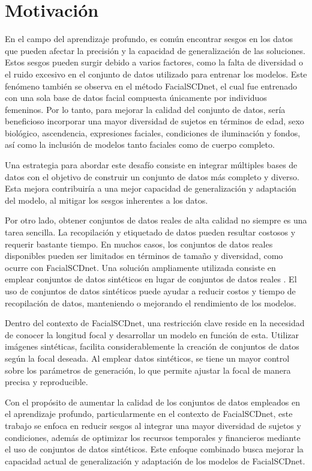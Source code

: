 \section{Motivación}

En el campo del aprendizaje profundo, es común encontrar sesgos en los datos que pueden afectar la precisión y la capacidad de generalización de las soluciones. Estos sesgos pueden surgir debido a varios factores, como la falta de diversidad o el ruido excesivo en el conjunto de datos utilizado para entrenar los modelos. Este fenómeno también se observa en el método FacialSCDnet, el cual fue entrenado con una sola base de datos facial compuesta únicamente por individuos femeninos.
Por lo tanto, para mejorar la calidad del conjunto de datos, sería beneficioso incorporar una mayor diversidad de sujetos en términos de edad, sexo biológico, ascendencia, expresiones faciales, condiciones de iluminación y fondos, así como la inclusión de modelos tanto faciales como de cuerpo completo. 

Una estrategia para abordar este desafío consiste en integrar múltiples bases de datos con el objetivo de construir un conjunto de datos más completo y diverso. Esta mejora contribuiría a una mejor capacidad de generalización y adaptación del modelo, al mitigar los sesgos inherentes a los datos.

Por otro lado, obtener conjuntos de datos reales de alta calidad no siempre es una tarea sencilla. La recopilación y etiquetado de datos pueden resultar costosos y requerir bastante tiempo. En muchos casos, los conjuntos de datos reales disponibles pueden ser limitados en términos de tamaño y diversidad, como ocurre con FacialSCDnet.
Una solución ampliamente utilizada consiste en emplear conjuntos de datos sintéticos en lugar de conjuntos de datos reales \cite{57,58,59}.
El uso de conjuntos de datos sintéticos puede ayudar a reducir costos y tiempo de recopilación de datos, manteniendo o mejorando el rendimiento de los modelos.

Dentro del contexto de FacialSCDnet, una restricción clave reside en la necesidad de conocer la longitud focal y desarrollar un modelo en función de esta. Utilizar imágenes sintéticas, facilita considerablemente la creación de conjuntos de datos según la focal deseada.
Al emplear datos sintéticos, se tiene un mayor control sobre los parámetros de generación, lo que permite ajustar la focal de manera precisa y reproducible.

Con el propósito de aumentar la calidad de los conjuntos de datos empleados en el aprendizaje profundo, particularmente en el contexto de FacialSCDnet, este trabajo se enfoca en reducir sesgos al integrar una mayor diversidad de sujetos y condiciones, además de optimizar los recursos temporales y financieros mediante el uso de conjuntos de datos sintéticos. Este enfoque combinado busca mejorar la capacidad actual de generalización y adaptación de los modelos de FacialSCDnet.

